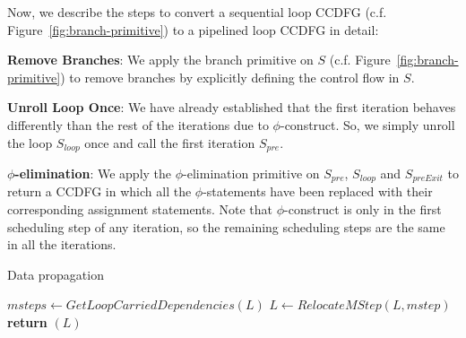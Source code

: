 Now, we describe the steps to convert a sequential loop CCDFG (c.f. Figure~\ref{fig:branch-primitive}) to a pipelined loop CCDFG in detail:
 
{\bf Remove Branches}: We apply the branch primitive on $S$ (c.f. Figure~\ref{fig:branch-primitive}) to remove branches by explicitly defining the control flow in $S$. 

{\bf Unroll Loop Once}: We have already established that the first iteration behaves differently than the rest of the
iterations due to $\phi$-construct. So, we simply unroll the loop $S_{loop}$ once and call the first iteration $S_{pre}$. 

{\bf $\phi$-elimination}: We apply the $\phi$-elimination primitive on $S_{pre}$, $S_{loop}$ and $S_{preExit}$ to return a CCDFG in which all the $\phi$-statements have been replaced with their corresponding assignment statements. Note that $\phi$-construct is only in the first scheduling step of any iteration, so the remaining scheduling steps are the same in all the iterations.

\begin{algorithm}
\caption{Data propagation} 
\label{algo:data-propagation}
\begin{algorithmic}[1]
\State $msteps \leftarrow GetLoopCarriedDependencies(L)$
\State $L \leftarrow RelocateMStep (L, mstep)$
\EndIf
\EndFor
\State \textbf{return} $(L)$
\EndProcedure
\end{algorithmic}
\end{algorithm}

